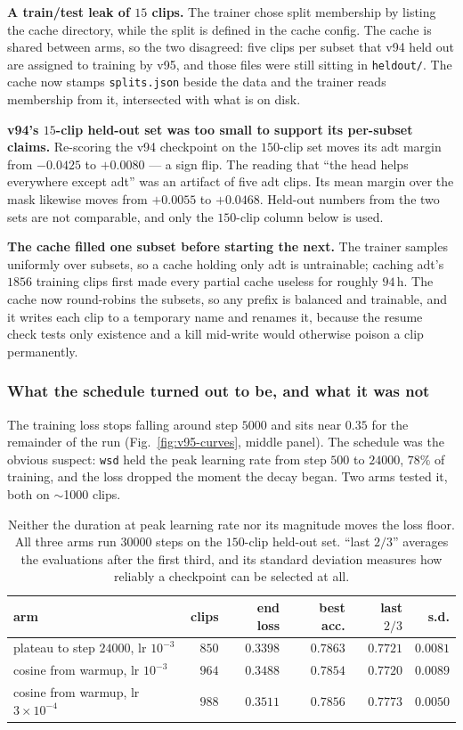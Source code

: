 \documentclass[11pt,a4paper]{article}
\begin{document}
\textbf{A train/test leak of $15$ clips.} The trainer chose split membership by listing the cache
directory, while the split is defined in the cache config. The cache is shared between arms, so
the two disagreed: five clips per subset that v94 held out are assigned to training by v95, and
those files were still sitting in \texttt{heldout/}. The cache now stamps \texttt{splits.json}
beside the data and the trainer reads membership from it, intersected with what is on disk.

\textbf{v94's $15$-clip held-out set was too small to support its per-subset claims.} Re-scoring
the v94 checkpoint on the $150$-clip set moves its adt margin from $-0.0425$ to $+0.0080$ --- a
sign flip. The reading that ``the head helps everywhere except adt'' was an artifact of five adt
clips. Its mean margin over the mask likewise moves from $+0.0055$ to $+0.0468$. Held-out numbers
from the two sets are not comparable, and only the $150$-clip column below is used.

\textbf{The cache filled one subset before starting the next.} The trainer samples uniformly over
subsets, so a cache holding only adt is untrainable; caching adt's $1856$ training clips first
made every partial cache useless for roughly $94$\,h. The cache now round-robins the subsets, so
any prefix is balanced and trainable, and it writes each clip to a temporary name and renames it,
because the resume check tests only existence and a kill mid-write would otherwise poison a clip
permanently.

\subsubsection{What the schedule turned out to be, and what it was not}
The training loss stops falling around step $5000$ and sits near $0.35$ for the remainder of the
run (Fig.~\ref{fig:v95-curves}, middle panel). The schedule was the obvious suspect: \texttt{wsd}
held the peak learning rate from step $500$ to $24000$, $78\%$ of training, and the loss dropped
the moment the decay began. Two arms tested it, both on $\sim$1000 clips.

\begin{table}[h]
\centering
\caption{Neither the duration at peak learning rate nor its magnitude moves the loss floor. All
three arms run $30000$ steps on the $150$-clip held-out set. ``last $2/3$'' averages the
evaluations after the first third, and its standard deviation measures how reliably a checkpoint
can be selected at all.}
\label{tab:v95-schedule}
\begin{tabular}{lrrrrr}
\toprule
arm & clips & end loss & best acc. & last $2/3$ & s.d. \\
\midrule
plateau to step $24000$, lr $10^{-3}$ & $850$  & $0.3398$ & $0.7863$ & $0.7721$ & $0.0081$ \\
cosine from warmup, lr $10^{-3}$      & $964$  & $0.3488$ & $0.7854$ & $0.7720$ & $0.0089$ \\
cosine from warmup, lr $3\times10^{-4}$ & $988$ & $0.3511$ & $0.7856$ & $0.7773$ & $\mathbf{0.0050}$ \\
\bottomrule
\end{tabular}
\end{table}
\end{document}
